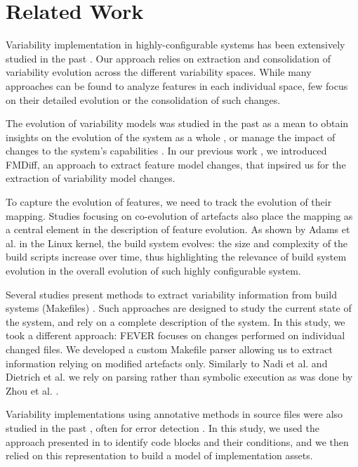 \section{Related Work}
\label{sec:related}

Variability implementation in highly-configurable systems has been extensively studied in the past \citep{thum_classification_2014}.
Our approach relies on extraction and consolidation of variability evolution across the different variability spaces.
While many approaches can be found to analyze features in each individual space,
few focus on their detailed evolution or the consolidation of such changes.

The evolution of variability models was studied in the past as a mean to obtain insights 
on the evolution of the system as a whole \citep{lotufo_evolution_2010},
or manage the impact of changes to the system's capabilities \citep{heider_case_2012,schaefer_evaluating_2015}.
In our previous work \citep{dintzner_analysing_2015}, we introduced FMDiff, an approach to extract feature model changes, that inpsired us for the extraction of variability model changes.

To capture the evolution of features, we need to track the evolution of their mapping.
Studies focusing on co-evolution of artefacts \citep{passos_coevolution_2015,neves_safe_2015} also place the 
mapping as a central element in the description of feature evolution.
As shown by Adams et al. \citep{adams_evolution_2008} in the Linux kernel, the build system
evolves: the size and complexity of the build scripts increase over time, thus highlighting the relevance
of build system evolution in the overall evolution of such highly configurable system.

Several studies present methods to extract variability information from build systems (Makefiles) \citep{dietrich_robust_2012,zhou_extracting_2015,nadi_mining_2014}.
Such approaches are designed to study the current state of the system, and rely on a complete description of the system.
In this study, we took a different approach: FEVER focuses on changes performed on individual changed files.
We developed a custom Makefile parser allowing us to extract information relying on modified artefacts only.
Similarly to Nadi et al. \citep{nadi_mining_2014} and Dietrich et al. \citep{dietrich_robust_2012} we rely on parsing rather than symbolic execution as was done by Zhou et al. \citep{zhou_extracting_2015}.

Variability implementations using annotative methods in source files were also studied in the past \citep{liebig_scalable_2013}, often for error detection \citep{kenner_typechef:_2010,tartler_dead_2009,tartler_feature_2011}.
In this study, we used the approach presented in \citep{liebig_analysis_2010} to identify code blocks and their conditions, and we then relied on 
this representation to build a model of implementation assets.

